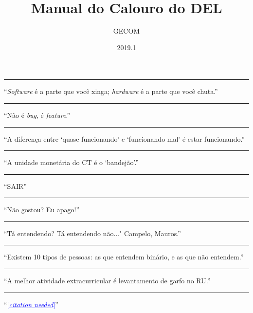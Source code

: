 \documentclass[titlepage]{article}
\newcommand{\citacao}[1]{
  \vspace{1em}\hrule
  \begin{displayquote}
      \begin{flushright}
          #1
      \end{flushright}
  \end{displayquote}
}
\begin{document}
\title{Manual do Calouro do DEL}

\date{2019.1}

\author{GECOM}


\maketitle
\newpage

\tableofcontents
\citacao{``\textit{Software} é a parte que você xinga; \textit{hardware} é a parte que você chuta.''}
\pagebreak



\citacao{``Não é \textit{bug}, é \textit{feature}.''}
\pagebreak


\citacao{``A diferença entre `quase funcionando' e `funcionando mal' é estar funcionando.''}
\pagebreak


\citacao{``A unidade monetária do CT é o `bandejão'.''}
\pagebreak


\citacao{``SAIR''}
\pagebreak


\citacao{``Não gostou? Eu apago!''}
\pagebreak


\citacao{``Tá entendendo? Tá entendendo não..." Campelo, Mauros.''}
\pagebreak


\citacao{``Existem 10 tipos de pessoas: as que entendem binário, e as que não entendem.''}
\pagebreak

%


\citacao{``A melhor atividade extracurricular é levantamento de garfo no RU.''}
\pagebreak


\citacao{``\textcolor{blue}{[\underline{\textit{citation needed}}]}''}
\end{document}
